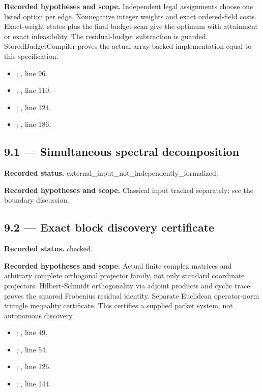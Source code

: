 \textbf{Recorded hypotheses and scope.} Independent legal assignments choose one listed option per edge. Nonnegative integer weights and exact ordered-field costs. Exact-weight states plus the final budget scan give the optimum with attainment or exact infeasibility. The residual-budget subtraction is guarded. StoredBudgetCompiler proves the actual array-backed implementation equal to this specification.

\begin{itemize}
\item {}; , line 96.
\item {}; , line 110.
\item {}; , line 124.
\item {}; , line 186.
\end{itemize}
\subsection{9.1 — Simultaneous spectral decomposition}
\label{result:9.1}
\textbf{Recorded status.} external\_input\_not\_independently\_formalized.

\textbf{Recorded hypotheses and scope.} Classical input tracked separately; see the boundary discussion.

\subsection{9.2 — Exact block discovery certificate}
\label{result:9.2}
\textbf{Recorded status.} checked.

\textbf{Recorded hypotheses and scope.} Actual finite complex matrices and arbitrary complete orthogonal projector family, not only standard coordinate projectors. Hilbert-Schmidt orthogonality via adjoint products and cyclic trace proves the squared Frobenius residual identity. Separate Euclidean operator-norm triangle inequality certificate. This certifies a supplied packet system, not autonomous discovery.

\begin{itemize}
\item {}; , line 49.
\item {}; , line 54.
\item {}; , line 126.
\item {}; , line 144.
\end{itemize}
